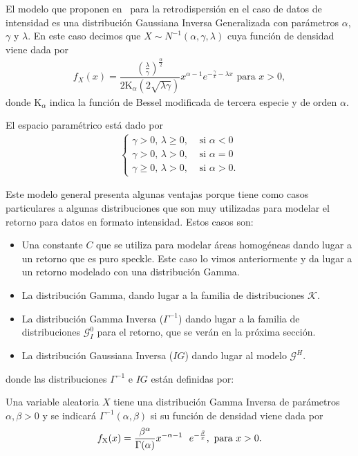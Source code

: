 El modelo que proponen en~\cite{Frery99} para la retrodispersión en el caso de datos de intensidad es una distribución Gaussiana Inversa Generalizada con parámetros $\alpha$, $\gamma$ y $\lambda$. En este caso decimos que  $X\sim N^{-1}(\alpha,\gamma,\lambda)$ cuya función de densidad viene dada por
\begin{align}
f_X(x) = \dfrac{\left(\frac{\lambda}{\gamma}\right)^{\frac{\alpha}{2}}}{2 \text{K}_{\alpha} (2 \sqrt{\lambda \gamma})} x^{\alpha-1} e^{-\frac{\gamma}{x}-\lambda x} \text{ para } x>0,
\label{GIG}
\end{align}
donde $\text{K}_{\alpha}$ indica la función de Bessel modificada de tercera especie y de orden $\alpha$. 

El espacio paramétrico está dado por
\begin{align}
\begin{cases}
\label{EspacioParametros}
	\gamma>0,      \,  \lambda \geq 0,  & \text{ si } \alpha < 0\\
	\gamma>0,      \,  \lambda >0,      & \text{ si } \alpha=0\\
	\gamma \geq 0, \,  \lambda >0,      & \text{ si } \alpha>0.
\end{cases}
\end{align}

Este modelo general presenta algunas ventajas porque tiene como casos particulares a algunas distribuciones que son muy utilizadas para modelar el retorno para datos en formato intensidad. Estos casos son:

\begin{itemize}
	\item Una constante $C$ que se utiliza para modelar áreas homogéneas dando lugar a un retorno que es puro speckle. Este caso lo vimos anteriormente y da lugar a un retorno modelado con una distribución Gamma.
	\item La distribución Gamma, dando lugar a la familia de distribuciones $\mathcal{K}$. 
	\item La distribución Gamma Inversa ($\Gamma^{-1}$) dando lugar a la familia de distribuciones $\mathcal{G}_I^0$ para el retorno, que se verán en la próxima sección.
	\item La distribución Gaussiana Inversa ($IG$) dando lugar al modelo $\mathcal{G}^H$.
\end{itemize}

donde las distribuciones $\Gamma^{-1}$ e  $IG$ están definidas por:

\begin{definition}
	\label{InversaGamma}
	Una variable aleatoria $X$ tiene una distribución Gamma Inversa  de parámetros $\alpha, \beta >0$  y se indicará $\Gamma^{-1}(\alpha,\beta)$ si su función de densidad viene dada por
	\begin{align}
	f_{\text X}(x)=\dfrac{\beta^{\alpha}}{\Gamma(\alpha)} x^{-\alpha-1} \ \ e^{- \frac{\beta}{x}}, \text{ para } x>0.
	\end{align}
\end{definition}

